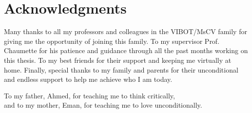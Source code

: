 \documentclass[twoside,a4,12p]{report} %
\begin{document}
\newpage

\setcounter{page}{1} \pagestyle{fancy}
\renewcommand{\chaptermark}[1]{\markboth{\chaptername%
\ \thechapter:\,\ #1}{}}
\renewcommand{\sectionmark}[1]{\markright{\thesection\,\ #1}}



\chapter*{Acknowledgments}

\begin{center}
Many thanks to all my professors and colleagues in the VIBOT/MsCV family for giving me the opportunity of joining this family. To my supervisor Prof. Chaumette for his patience and guidance through all the past months working on this thesis. To my best friends for their support and keeping me virtually at home. Finally, special thanks to my family and parents for their unconditional and endless support to help me achieve who I am today.

To my father, Ahmed, for teaching me to think critically,\\ and to my mother, Eman, for teaching me to love unconditionally.
\end{center}

\doublespacing

\setcounter{page}{1} \pagestyle{plain}

\tableofcontents

\listoffigures

\pagestyle{fancy}
\newpage

\addtolength{\headheight}{3pt} \fancyhead{}
\fancyhead[LE]{\sl\leftmark} \fancyhead[LO,RE]{\rm\thepage}
\fancyhead[RO]{\sl\rightmark} \fancyfoot[C,L,E]{}

\onehalfspacing





%


\nocite{*}



         {\protect{}}
\end{document}
